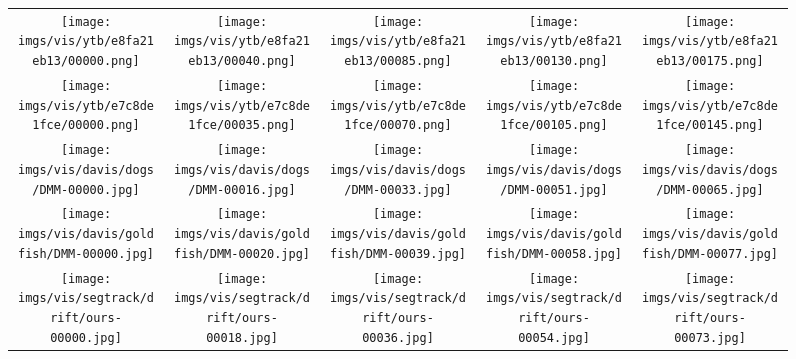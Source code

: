 \begin{figure*}[t]
	\centering
	\begin{tabular}{@{\hspace{0mm}}c@{\hspace{0 mm}}c@{\hspace{0 mm}}c@{\hspace{0mm}}c@{\hspace{0mm}}c}
		\texttt{[image: imgs/vis/ytb/e8fa21eb13/00000.png]}&
		\texttt{[image: imgs/vis/ytb/e8fa21eb13/00040.png]}&
		\texttt{[image: imgs/vis/ytb/e8fa21eb13/00085.png]}&
		\texttt{[image: imgs/vis/ytb/e8fa21eb13/00130.png]}&
		\texttt{[image: imgs/vis/ytb/e8fa21eb13/00175.png]}\\[-1.0mm]
		\texttt{[image: imgs/vis/ytb/e7c8de1fce/00000.png]}&
		\texttt{[image: imgs/vis/ytb/e7c8de1fce/00035.png]}&
		\texttt{[image: imgs/vis/ytb/e7c8de1fce/00070.png]}&
		\texttt{[image: imgs/vis/ytb/e7c8de1fce/00105.png]}&
		\texttt{[image: imgs/vis/ytb/e7c8de1fce/00145.png]}\\[-1.0mm]
\texttt{[image: imgs/vis/davis/dogs/DMM-00000.jpg]}&
		\texttt{[image: imgs/vis/davis/dogs/DMM-00016.jpg]}&
		\texttt{[image: imgs/vis/davis/dogs/DMM-00033.jpg]}&
		\texttt{[image: imgs/vis/davis/dogs/DMM-00051.jpg]}&
		\texttt{[image: imgs/vis/davis/dogs/DMM-00065.jpg]}\\[-1.0mm]
		\texttt{[image: imgs/vis/davis/goldfish/DMM-00000.jpg]}&
		\texttt{[image: imgs/vis/davis/goldfish/DMM-00020.jpg]}&
		\texttt{[image: imgs/vis/davis/goldfish/DMM-00039.jpg]}&
		\texttt{[image: imgs/vis/davis/goldfish/DMM-00058.jpg]}&
		\texttt{[image: imgs/vis/davis/goldfish/DMM-00077.jpg]}\\[-1.0mm]
\texttt{[image: imgs/vis/segtrack/drift/ours-00000.jpg]}&
		\texttt{[image: imgs/vis/segtrack/drift/ours-00018.jpg]}&
		\texttt{[image: imgs/vis/segtrack/drift/ours-00036.jpg]}&
		\texttt{[image: imgs/vis/segtrack/drift/ours-00054.jpg]}&
		\texttt{[image: imgs/vis/segtrack/drift/ours-00073.jpg]}\\[-1.0mm]

\end{tabular}
\end{figure*}
